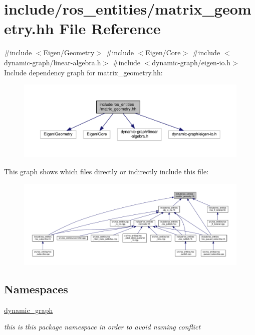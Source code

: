 \hypertarget{matrix__geometry_8hh}{}\section{include/ros\+\_\+entities/matrix\+\_\+geometry.hh File Reference}
\label{matrix__geometry_8hh}
{\ttfamily \#include $<$Eigen/\+Geometry$>$}\newline
{\ttfamily \#include $<$Eigen/\+Core$>$}\newline
{\ttfamily \#include $<$dynamic-\/graph/linear-\/algebra.\+h$>$}\newline
{\ttfamily \#include $<$dynamic-\/graph/eigen-\/io.\+h$>$}\newline
Include dependency graph for matrix\+\_\+geometry.\+hh\+:
\nopagebreak
\begin{figure}[H]
\begin{center}
\leavevmode
\includegraphics[width=350pt]{matrix__geometry_8hh__incl}
\end{center}
\end{figure}
This graph shows which files directly or indirectly include this file\+:
\nopagebreak
\begin{figure}[H]
\begin{center}
\leavevmode
\includegraphics[width=350pt]{matrix__geometry_8hh__dep__incl}
\end{center}
\end{figure}
\subsection*{Namespaces}
\begin{DoxyCompactItemize}
\item 
 \hyperlink{namespacedynamic__graph}{dynamic\+\_\+graph}
\begin{DoxyCompactList}\small\item\em this is this package namespace in order to avoid naming conflict \end{DoxyCompactList}\end{DoxyCompactItemize}
